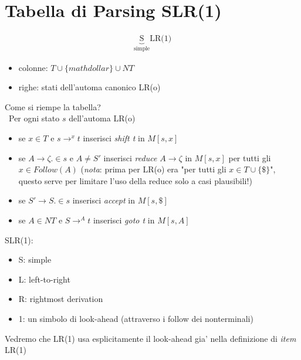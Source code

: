 \documentclass[a4paper,12pt]{article}
\begin{document}
{\section{Tabella di Parsing SLR(1)}
\begin{align*}
  \underbrace{\text{S}}_\text{simple}\text{LR(1)}
\end{align*}
\begin{itemize}
  \item colonne: $T \cup \{mathdollar\} \cup NT$
  \item righe: stati dell'automa canonico LR(o)
\end{itemize}
Come si riempe la tabella? \\\
Per ogni stato $s$ dell'automa LR(o)
\begin{itemize}
  \item se $x \in T$ e $s \to^x t$ inserisci \textit{shift t} in $M[s,x]$
  \item se $A \to \zeta. \in s$ e $A \neq S'$ inserisci \textit{reduce $A \to \zeta$} in $M[s,x]$ per tutti gli $x \in Follow(A)$ (\textit{nota}: prima per LR(o) era "per tutti gli $x \in T \cup \{\mathdollar\}$", questo serve per limitare l'uso della reduce solo a casi plausibili!)
  \item se $S' \to S. \in s$ inserisci \textit{accept} in $M[s,\mathdollar]$
  \item se $A \in NT$ e $S \to^A t$ inserisci \textit{goto t} in $M[s,A]$
\end{itemize}
SLR(1):
\begin{itemize}
  \item S: simple
  \item L: left-to-right
  \item R: rightmost derivation
  \item 1: un simbolo di look-ahead (attraverso i follow dei nonterminali)
\end{itemize}
Vedremo che LR(1) usa esplicitamente il look-ahead gia' nella definizione di \textit{item} LR(1) \\
\vspace{1em} \\
}
\end{document}
